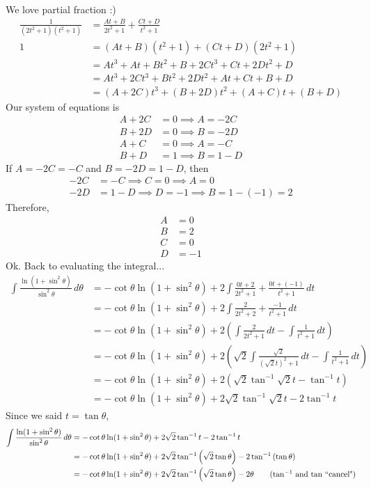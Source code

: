 \documentclass{article}
\newcommand{\lrp}[1]{\left( #1 \right)}
\begin{document}
We love partial fraction :)
\begin{align*}
    \frac{1}{(2t^2+1)(t^2+1)}&=\frac{At+B}{2t^2+1}+\frac{Ct+D}{t^2+1}\\
    1&=(At+B)(t^2+1)+(Ct+D)(2t^2+1)\tag{multiply both sides by $(2t^2+1)(t^2+1)$}\\
    &=At^3+At+Bt^2+B+2Ct^3+Ct+2Dt^2+D\\
    &=At^3+2Ct^3+Bt^2+2Dt^2+At+Ct+B+D\\
    &=(A+2C)t^3+(B+2D)t^2+(A+C)t+(B+D)\tag{factor}
\end{align*}
Our system of equations is
\begin{align*}
    A+2C&=0\implies A=-2C\\
    B+2D&=0\implies B=-2D\\
    A+C&=0\implies A=-C\\
    B+D&=1\implies B=1-D
\end{align*}
If $A=-2C=-C$ and $B=-2D=1-D$, then
\begin{align*}
    -2C&=-C\implies C=0\implies A=0\\
    -2D&=1-D\implies D=-1\implies B=1-(-1)=2
\end{align*}
Therefore,
\begin{align*}
    A&=0\\
    B&=2\\
    C&=0\\
    D&=-1
\end{align*}
Ok. Back to evaluating the integral...
\begin{align*}
    \int\frac{\ln(1+\sin^2\theta)}{\sin^2\theta}\,d\theta&=-\cot \theta \ln (1+\sin^2\theta)+2\int\frac{0t+2}{2t^2+1}+\frac{0t+(-1)}{t^2+1}\,dt\\
    &=-\cot \theta \ln (1+\sin^2\theta)+2\int\frac{2}{2t^2+2}+\frac{-1}{t^2+1}\,dt\\
    &=-\cot \theta \ln (1+\sin^2\theta)+2\lrp{\int\frac{2}{2t^2+1}\,dt-\int\frac{1}{t^2+1}\,dt}\\
    &=-\cot \theta \ln (1+\sin^2\theta)+2\lrp{\sqrt{2}\int\frac{\sqrt{2}}{(\sqrt{2}t)^2+1}\,dt-\int\frac{1}{t^2+1}\,dt}\\
    &=-\cot \theta \ln (1+\sin^2\theta)+2\lrp{\sqrt{2}\tan^{-1}\sqrt{2}t-\tan^{-1}t}\tag{let $C=0$ aka ignore $C$}\\
    &=-\cot \theta \ln (1+\sin^2\theta)+2\sqrt{2}\tan^{-1}\sqrt{2}t-2\tan^{-1}t
\end{align*}
Since we said $t=\tan\theta$,
\begin{align*}
    \int\frac{\ln (1+\sin^2\theta)}{\sin^2\theta}\,d\theta&=-\cot \theta \ln (1+\sin^2\theta)+2\sqrt{2}\tan^{-1}t-2\tan^{-1}t\\
    &=-\cot \theta \ln (1+\sin^2\theta)+2\sqrt{2}\tan^{-1}\lrp{\sqrt{2}\tan \theta}-2\tan^{-1}\lrp{\tan\theta}\\
    &=-\cot \theta \ln (1+\sin^2\theta)+2\sqrt{2}\tan^{-1}\lrp{\sqrt{2}\tan\theta}-2\theta\tag{$\tan^{-1}$ and $\tan$ ``cancel"}
\end{align*}
\end{document}
